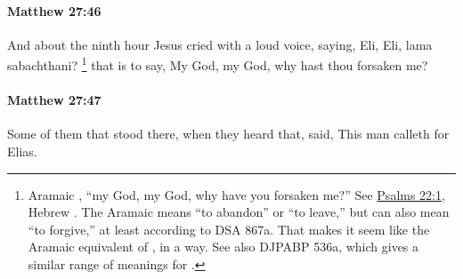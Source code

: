 		\paragraph{Matthew 27:46} %
			\label{MATTHEW-27-46}

			And about the ninth hour Jesus cried with a loud voice, saying, Eli, Eli, lama sabachthani?%
				\footnote{%
					Aramaic , ``my God, my God, why have you forsaken me?'' See \hyperref[PSALMS-22-1]{Psalms 22:1}, Hebrew . The Aramaic  means ``to abandon'' or ``to leave,'' but can also mean ``to forgive,'' at least according to DSA 867a. That makes it seem like the Aramaic equivalent of , in a way. See also DJPABP 536a, which gives a similar range of meanings for .
					}
			that is to say, My God, my God, why hast thou forsaken me?

			\begin{framed}
			\scriptsize
				\begin{compactdesc}
					\item[SBLG] 
				\end{compactdesc}
			\end{framed}

		\paragraph{Matthew 27:47} %
			\label{MATTHEW-27-47}

			Some of them that stood there, when they heard that, said, This man calleth for Elias.

